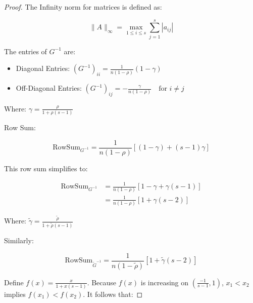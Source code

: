 \begin{proof}
The Infinity norm for matrices is defined as:

\begin{equation}\label{eq:app-lemma4-infinity-norm-definition}
\|A\|_\infty = \max_{1 \leq i \leq s} \sum_{j=1}^{s} |a_{ij}|
\end{equation}

The entries of $G^{-1}$ are:

\begin{itemize}
	\item Diagonal Entries: $ (G^{-1})_{ii} = \frac{1}{n (1 - \rho)} \left( 1 - \gamma \right) $
	\item Off-Diagonal Entries: $ (G^{-1})_{ij} = -\frac{\gamma}{n (1 - \rho)} \quad \text{for } i \neq j $
\end{itemize}

Where:
$ \gamma = \frac{\rho}{1 + \rho (s - 1)} $

Row Sum:

\begin{equation}\label{eq:app-lemma4-raw-row-sum}
\text{RowSum}_{G^{-1}} = \frac{1}{n (1 - \rho)} \left[ (1 - \gamma) + (s - 1) \gamma \right]
\end{equation}

This row sum simplifies to:

\begin{equation}\label{eq:app-lemma4-raw-row-sum-simplified}
\begin{aligned}
\text{RowSum}_{G^{-1}}
&= \frac{1}{n (1 - \rho)} \left[ 1 - \gamma + \gamma (s - 1) \right] \\
&= \frac{1}{n (1 - \rho)} \left[ 1 + \gamma (s - 2) \right]
\end{aligned}
\end{equation}

Where: $ \tilde{\gamma} = \frac{\tilde{\rho}}{1 + \tilde{\rho} (s - 1)} $

Similarly:

\begin{equation}\label{eq:app-lemma4-binarized-row-sum}
\text{RowSum}_{\tilde{G}^{-1}} = \frac{1}{n (1 - \tilde{\rho})} \left[ 1 + \tilde{\gamma} (s - 2) \right]
\end{equation}

Define $ f(x) = \frac{x}{1 + x (s - 1)} $. Because $ f(x) $ is increasing on $\left(\frac{-1}{s-1}, 1\right)$, $ x_1 < x_2 $ implies $ f(x_1) < f(x_2) $. It follows that:


\end{proof}
